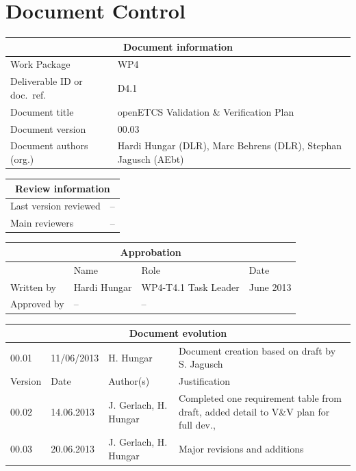 \documentclass{template/openetcs_report}
\begin{document}
\maketitle
\tableofcontents
\listoffiguresandtables
\newpage

\chapter{Document Control}

\begin{tabular}{|p{4.4cm}|p{8.7cm}|}
\hline
\multicolumn{2}{|c|}{Document information} \\
\hline
Work Package &  WP4  \\
Deliverable ID or doc.\ ref.\ & D4.1\\
\hline
Document title & openETCS Validation \& Verification Plan\\
Document version & 00.03 \\
Document authors (org.)  & Hardi Hungar (DLR), Marc Behrens (DLR),
Stephan Jagusch (AEbt) \\
\hline
\end{tabular}

\begin{tabular}{|p{4.4cm}|p{8.7cm}|}
\hline
\multicolumn{2}{|c|}{Review information} \\
\hline
Last version reviewed & -- \\
\hline
Main reviewers & -- \\
\hline
\end{tabular}

\begin{tabular}{|p{2.2cm}|p{4cm}|p{4cm}|p{2cm}|}
\hline
\multicolumn{4}{|c|}{Approbation} \\
\hline
  &  Name & Role & Date   \\
\hline  
Written by    &  Hardi Hungar & WP4-T4.1 Task Leader  &  June 2013\\
\hline
Approved by & -- & -- & \\
\hline
\end{tabular}

\begin{tabular}{|p{2.2cm}|p{2cm}|p{3cm}|p{5cm}|}
\hline
\multicolumn{4}{|c|}{Document evolution} \\
\hline
00.01 & 11/06/2013 & H. Hungar &  Document creation based on draft by
S. Jagusch\\
\hline
Version &  Date & Author(s) & Justification  \\
\hline  
00.02 & 14.06.2013 & J. Gerlach, H. Hungar &  Completed one
requirement table from draft, added detail to V\&V plan for full dev., \\
\hline  
00.03 & 20.06.2013 & J. Gerlach, H. Hungar & Major revisions and
additions
\\
\hline
\end{tabular}
\end{document}
